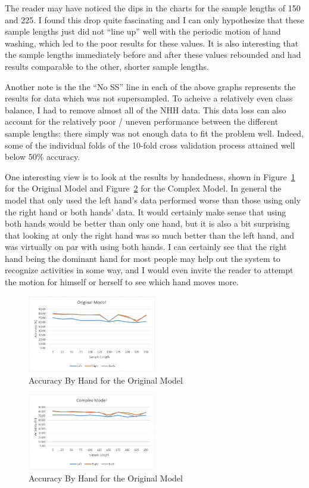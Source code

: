 \documentclass[]{report}
\begin{document}
The reader may have noticed the dips in the charts for the sample lengths of 150 and 225. I found this drop quite fascinating and I can only hypothesize that these sample lengths just did not ``line up'' well with the periodic motion of hand washing, which led to the poor results for these values. It is also interesting that the sample lengths immediately before and after these values rebounded and had results comparable to the other, shorter sample lengths.

Another note is the the ``No SS'' line in each of the above graphs represents the results for data which was not supersampled. To acheive a relatively even class balance, I had to remove almost all of the NHH data. This data loss can also account for the relatively poor / uneven performance between the different sample lengths: there simply was not enough data to fit the problem well. Indeed, some of the individual folds of the 10-fold cross validation process attained well below 50\% accuracy.

One interesting view is to look at the results by handedness, shown in Figure~\ref{handedness-original} for the Original Model and Figure~\ref{handedness-complex} for the Complex Model. In general the model that only used the left hand's data performed worse than those using only the right hand or both hands' data. It would certainly make sense that using both hands would be better than only one hand, but it is also a bit surprising that looking at only the right hand was so much better than the left hand, and was virtually on par with using both hands. I can certainly see that the right hand being the dominant hand for most people may help out the system to recognize activities in some way, and I would even invite the reader to attempt the motion for himself or herself to see which hand moves more.

\begin{figure}
	\centering
	\includegraphics[width=0.5\textwidth]{../images/handed2o}
	\caption{Accuracy By Hand for the Original Model}
	\label{handedness-original}
\end{figure}
\begin{figure}
	\centering
	\includegraphics[width=0.5\textwidth]{../images/handed2c}
	\caption{Accuracy By Hand for the Original Model}
	\label{handedness-complex}
\end{figure}
\end{document}
